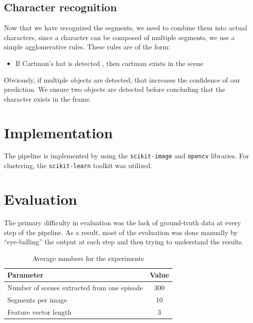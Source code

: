 \documentclass[10pt,twocolumn,letterpaper]{article}
\begin{document}
\subsection{Character recognition}

Now that we have recognized the segments, we need to combine them into
actual characters, since a character can be composed of multiple
segments, we use a simple agglomerative rules. These rules are of the
form:

\begin{itemize}
\item If Cartman's hat is detected , then cartman exists in the scene
\end{itemize}

Obviously, if multiple objects are detected, that increases the
confidence of our prediction. We ensure two objects are detected
before concluding that the character exists in the frame.

\section{Implementation}
The pipeline is implemented by using the \texttt{scikit-image} and
\texttt{opencv} libraries. For clustering, the \texttt{scikit-learn}
toolkit was utilized.



\section{Evaluation}

The primary difficulty in evaluation was the lack of ground-truth data
at every step of the pipeline. As a result, most of the evaluation was
done manually by ``eye-balling'' the output at each step and then
trying to understand the results.


\begin{table}
\begin{tabular}{|l|c|}
  \hline
  Parameter & Value \\
  \hline
Number of scenes extracted from one episode & 300  \\

Segments per image & 10 \\

Feature vector length &  3  \\
  
  \hline
\end{tabular}
\caption{Average numbers for the experiments}
\end{table}
\end{document}
